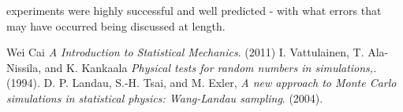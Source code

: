 \documentclass[twocolumn]{article}
\begin{document}
experiments were highly successful and well predicted - with what errors that may have occurred being discussed at length. 
\begin{thebibliography}{9}
Wei Cai
\textit{A Introduction to Statistical Mechanics}.
(2011)
I. Vattulainen, T. Ala-Nissila, and K. Kankaala
\textit{Physical tests for random numbers in simulations,}. 
(1994).
D. P. Landau, S.-H. Tsai, and M. Exler,
\textit{A new approach to Monte Carlo simulations in
statistical physics: Wang-Landau sampling}. 
(2004).
\end{thebibliography}
\end{document}
